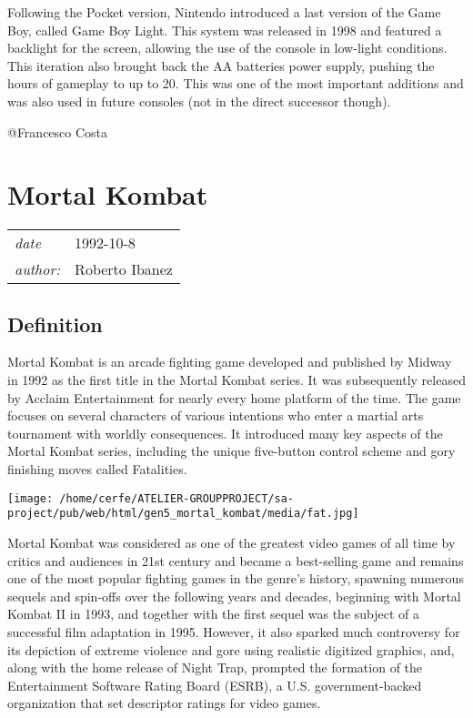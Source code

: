 \documentclass[a4paper,10pt]{book}
\newcommand{\pageHeader}[4]{
    \section{#1}
    \vspace{-0.3cm}
    \begin{table}[h!]
     \begin{tabular}{ll}
        \hline
        \textit{date} & #2 \\
        \textit{author: } & #3\\
        \hline
     \end{tabular}
    \end{table}
    \vspace{-0.3cm}
}
\begin{document}
          Following the Pocket version, Nintendo introduced a last version of
          the Game Boy, called Game Boy Light. This system was released in 1998
          and featured a backlight for the screen, allowing the use of the console
          in low-light conditions. This iteration also brought back the AA batteries
          power supply, pushing the hours of gameplay to up to 20. This was one of
          the most important additions and was also used in future consoles (not in
          the direct successor though).
         
 
 
 @Francesco Costa 
 
 \newpage\pageHeader{Mortal Kombat}{1992-10-8}{Roberto Ibanez}{Mortal Kombat, Fighting Game}
 \subsection{Definition }
 
            Mortal Kombat is an arcade fighting game developed and published by Midway in 1992 as the first title in the Mortal Kombat series. 
            It was subsequently released by Acclaim Entertainment for nearly every home platform of the time. 
            The game focuses on several characters of various intentions who enter a martial arts tournament with worldly consequences. 
            It introduced many key aspects of the Mortal Kombat series, including the unique five-button control scheme and gory finishing moves called Fatalities.
         
 \texttt{[image: /home/cerfe/ATELIER-GROUPPROJECT/sa-project/pub/web/html/gen5\_mortal\_kombat/media/fat.jpg]}
 
            Mortal Kombat was considered as one of the greatest video games of all time by critics and audiences in 21st century and became a best-selling game and remains one of the most popular fighting games in the genre's history, spawning numerous sequels and spin-offs over the following years and decades, beginning with Mortal Kombat II in 1993, and together with the first sequel was the subject of a successful film adaptation in 1995. 
            However, it also sparked much controversy for its depiction of extreme violence and gore using realistic digitized graphics, and, along with the home release of Night Trap, prompted the formation of the Entertainment Software Rating Board (ESRB), a U.S. government-backed organization that set descriptor ratings for video games.
         
\end{document}
